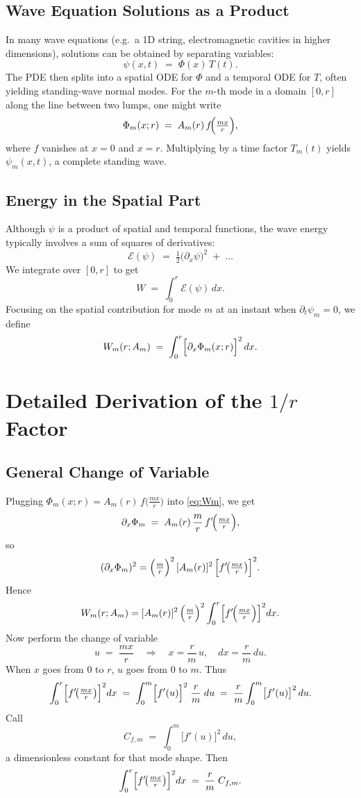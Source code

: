 \documentclass[12pt]{article}
\begin{document}
\subsection{Wave Equation Solutions as a Product}
In many wave equations (e.g.\ a 1D string, electromagnetic cavities in higher dimensions), solutions can be obtained by separating variables:
\[
\psi(x,t) \;=\; \Phi(x)\,T(t).
\]
The PDE then splits into a spatial ODE for \(\Phi\) and a temporal ODE for \(T\), often yielding standing-wave normal modes. For the \(m\)-th mode in a domain \([0,r]\) along the line between two lumps, one might write
\[
\Phi_m(x;r) \;=\; A_m(r)\, f\!\Bigl(\tfrac{m x}{r}\Bigr),
\]
where \(f\) vanishes at \(x=0\) and \(x=r\). Multiplying by a time factor \(T_m(t)\) yields \(\psi_m(x,t)\), a complete standing wave.

\subsection{Energy in the Spatial Part}
Although \(\psi\) is a product of spatial and temporal functions, the wave energy typically involves a sum of squares of derivatives:
\[
\mathcal{E}(\psi)
\;=\;
\tfrac12 \bigl(\partial_x \psi\bigr)^2
\;+\;\dots
\]
We integrate over \([0,r]\) to get
\[
W
\;=\;
\int_0^r \!\mathcal{E}(\psi)\,dx.
\]
Focusing on the spatial contribution for mode \(m\) at an instant when \(\partial_t \psi_m=0\), we define
\begin{equation}
W_m(r;A_m)
\;=\;
\int_{0}^{r}
\Bigl[\partial_x \Phi_m(x;r)\Bigr]^{2}\,dx.
\label{eq:Wm}
\end{equation}

\section{Detailed Derivation of the \texorpdfstring{$1/r$}{1/r} Factor}

\subsection{General Change of Variable}
Plugging \(\Phi_m(x;r)=A_m(r)\,f\!\bigl(\tfrac{m x}{r}\bigr)\) into \eqref{eq:Wm}, we get
\[
\partial_x \Phi_m
\;=\;
A_m(r)\,\frac{m}{r}\,f'\!\Bigl(\tfrac{m x}{r}\Bigr),
\]
so
\[
(\partial_x \Phi_m)^2
=
\Bigl(\tfrac{m}{r}\Bigr)^2\,[A_m(r)]^2\,\Bigl[f'\!\bigl(\tfrac{m x}{r}\bigr)\Bigr]^2.
\]
Hence
\[
W_m(r; A_m)
=
[A_m(r)]^2\,
\Bigl(\tfrac{m}{r}\Bigr)^2
\int_{0}^{r}
\Bigl[f'\!\Bigl(\tfrac{m x}{r}\Bigr)\Bigr]^2
dx.
\]
Now perform the change of variable
\[
u
\;=\;
\frac{m x}{r}
\quad\Longrightarrow\quad
x=\frac{r}{m}\,u,
\quad
dx=\frac{r}{m}\,du.
\]
When \(x\) goes from \(0\) to \(r\), \(u\) goes from \(0\) to \(m\). Thus
\[
\int_{0}^{r}
\Bigl[f'\!\bigl(\tfrac{m x}{r}\bigr)\Bigr]^2
dx
\;=\;
\int_{0}^{m}
\Bigl[f'(u)\Bigr]^2
\;\frac{r}{m}\;
du
\;=\;
\frac{r}{m}
\int_{0}^{m}
\bigl[f'(u)\bigr]^2\,du.
\]
Call
\[
C_{f,m}
\;=\;
\int_{0}^{m}
\bigl[f'(u)\bigr]^2\,du,
\]
a dimensionless constant for that mode shape. Then
\[
\int_{0}^{r}
\Bigl[f'\!\bigl(\tfrac{m x}{r}\bigr)\Bigr]^2
dx
\;=\;
\frac{r}{m}\;C_{f,m}.
\]
\end{document}
